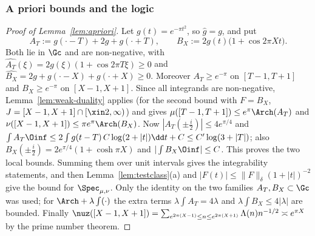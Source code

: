 \subsubsection{A priori bounds and the logic}\label{app:proofs-apriori}
\begin{proof}[Proof of Lemma~\textup{\ref{lem:apriori}}]
Let $g(t)=e^{-\pi t^2}$, so $\widehat g=g$, and put
\[
A_T:=g(\cdot-T)+2g+g(\cdot+T),\qquad B_X:=2g(t)\big(1+\cos2\pi Xt\big).
\]
Both lie in $\Gc$ and are non-negative, with $\widehat{A_T}(\xi)=2g(\xi)(1+\cos2\pi T\xi)\ge0$ and
$\widehat{B_X}=2g+g(\cdot-X)+g(\cdot+X)\ge0$. Moreover $A_T\ge e^{-\pi}$ on $[T-1,T+1]$ and $\widehat{B_X}\ge e^{-\pi}$
on $[X-1,X+1]$. Since all integrands are non-negative, Lemma~\ref{lem:weak-duality} applies (for the second bound with
$F=B_X$, $J=[X-1,X+1]\cap[\xin2,\infty)$) and gives $\mu([T-1,T+1])\le e^{\pi}\Arch(A_T)$ and
$\nu([X-1,X+1])\le\pi e^{\pi}\Arch(B_X)$. Now $|A_T(\pm\frac i2)|\le4e^{\pi/4}$ and
$\int A_T\Oinf\le2\int g(t-T)\,C\log(2+|t|)\dd t+C\le C'\log(3+|T|)$; also $B_X(\pm\frac i2)=2e^{\pi/4}(1+\cosh\pi X)$ and
$|\int B_X\Oinf|\le C$. This proves the two local bounds. Summing them over unit intervals gives the integrability
statements, and then Lemma~\ref{lem:testclass}(a) and $|F(t)|\le\|F\|_\delta(1+|t|)^{-2}$ give the bound for
$\Spec_{\mu,\nu}$. Only the identity on the two families $A_T,B_X\subset\Gc$ was used; for $\Arch+\lambda\int(\cdot)$
the extra terms $\lambda\int A_T=4\lambda$ and $\lambda\int B_X\le4|\lambda|$ are bounded. Finally
$\nuz([X-1,X+1])=\sum_{e^{2\pi(X-1)}\le n\le e^{2\pi(X+1)}}\Lambda(n)n^{-1/2}\asymp e^{\pi X}$ by the prime number theorem.
\end{proof}

